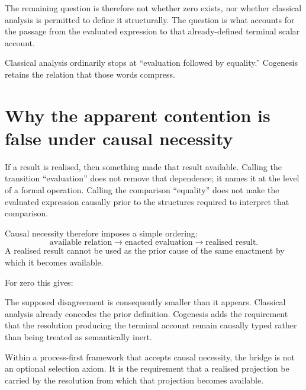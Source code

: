 \documentclass[11pt]{article}
\begin{document}
\medskip
\noindent
{}
\medskip

The remaining question is therefore not whether zero exists, nor whether classical analysis is permitted to define it structurally. The question is what accounts for the passage from the evaluated expression to that already-defined terminal scalar account.

Classical analysis ordinarily stops at ``evaluation followed by equality.'' Cogenesis retains the relation that those words compress.

\section{Why the apparent contention is false under causal necessity}

If a result is realised, then something made that result available. Calling the transition ``evaluation'' does not remove that dependence; it names it at the level of a formal operation. Calling the comparison ``equality'' does not make the evaluated expression causally prior to the structures required to interpret that comparison.

Causal necessity therefore imposes a simple ordering:
\[
\text{available relation}
\longrightarrow
\text{enacted evaluation}
\longrightarrow
\text{realised result}.
\]
A realised result cannot be used as the prior cause of the same enactment by which it becomes available.

For zero this gives:

\medskip
\noindent
{}
\medskip

The supposed disagreement is consequently smaller than it appears. Classical analysis already concedes the prior definition. Cogenesis adds the requirement that the resolution producing the terminal account remain causally typed rather than being treated as semantically inert.

Within a process-first framework that accepts causal necessity, the bridge is not an optional selection axiom. It is the requirement that a realised projection be carried by the resolution from which that projection becomes available.
\end{document}
